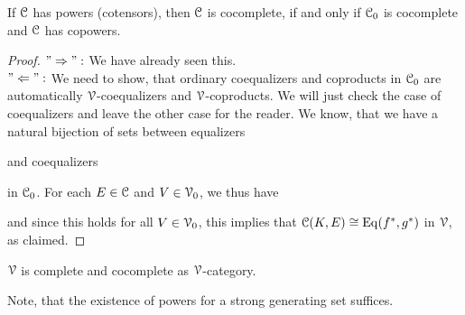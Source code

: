 \documentclass[a4paper,11pt,oneside,openany]{scrbook}
\begin{document}
\begin{prop}
	If $\operatorname{\mathcal{C}}$ has powers (cotensors), then $\operatorname{\mathcal{C}}$ is cocomplete, if and only if $\operatorname{\mathcal{C}}_{0}$ is cocomplete and $\operatorname{\mathcal{C}}$ has copowers.
\end{prop}

\begin{proof}
	$"\Rightarrow ":$ We have already seen this. \\
	$"\Leftarrow ":$ We need to show, that ordinary coequalizers and coproducts in $\operatorname{\mathcal{C}}_{0}$ are automatically $\operatorname{\mathcal{V}}$-coequalizers and $\operatorname{\mathcal{V}}$-coproducts.
	We will just check the case of coequalizers and leave the other case for the reader. We know, that we have a natural bijection of sets between
	equalizers
	\begin{center}
	\end{center}
	and coequalizers
	\begin{center}
	\end{center}
	in $\operatorname{\mathcal{C}}_{0}$. For each $E \in \operatorname{\mathcal{C}}$ and $V \in \operatorname{\mathcal{V}}_{0}$, we thus have
	\begin{center}
	\end{center}
	and since this holds for all $V \in \operatorname{\mathcal{V}}_{0}$, this implies that $\operatorname{\mathcal{C}}(K,E) \cong \operatorname{Eq}(f^{\ast},g^{\ast})$ in $\operatorname{\mathcal{V}}$, as claimed.
\end{proof}

\begin{cor}
	$\operatorname{\mathcal{V}}$ is complete and cocomplete as $\operatorname{\mathcal{V}}$-category.
\end{cor}

\begin{rmk}
	Note, that the existence of powers for a strong generating set suffices.
\end{rmk}
\end{document}
